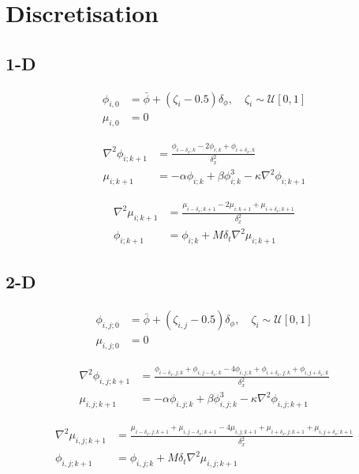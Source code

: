 \documentclass[a4paper,11pt]{article}
\begin{document}
\section*{Discretisation}

\subsection*{1-D}
\begin{align*}
    \phi_{i, 0} &= \bar{\phi} + (\zeta_i - 0.5)\delta_\phi, \quad \zeta_i \sim \mathcal{U}[0,1]\\
    \mu_{i,0} &= 0
\end{align*}

\begin{align*}
    \nabla^2\phi_{i;k+1} &= \frac{\phi_{i-\delta_x;k} - 2\phi_{i;k} + \phi_{i+\delta_x;k}}{\delta_x^{2}}\\
    \mu_{i;k+1} &= - \alpha\phi_{i;k} + \beta\phi_{i;k}^3 - \kappa\nabla^2\phi_{i;k+1}
\end{align*}

\begin{align*}
    \nabla^2\mu_{i;k+1} &= \frac{\mu_{i-\delta_x;k+1} - 2\mu_{i;k+1}+\mu_{i+\delta_x;k+1}}{\delta_x^{2}}\\
    \phi_{i;k+1} &= \phi_{i;k} + M\delta_t\nabla^2\mu_{i;k+1}
\end{align*}

\subsection*{2-D}

\begin{align*}
    \phi_{i,j; 0} &= \bar{\phi} + (\zeta_{i,j} - 0.5)\delta_\phi, \quad \zeta_i \sim \mathcal{U}[0,1]\\
    \mu_{i,j;0} &= 0
\end{align*}

\begin{align*}
    \nabla^2\phi_{i,j;k+1} &= \frac{\phi_{i-\delta_x,j;k} + \phi_{i,j-\delta_x;k} - 4\phi_{i,j;k} + \phi_{i+\delta_x,j;k} + \phi_{i,j+\delta_x;k}}{\delta_x^{2}}\\
    \mu_{i,j;k+1} &= - \alpha\phi_{i,j;k} + \beta\phi_{i,j;k}^3 - \kappa\nabla^2\phi_{i,j;k+1}
\end{align*}

\begin{align*}
    \nabla^2\mu_{i,j;k+1} &= \frac{\mu_{i-\delta_x,j;k+1} + \mu_{i,j-\delta_x;k+1}- 4\mu_{i,j;k+1}+\mu_{i+\delta_x,j;k+1}+\mu_{i,j+\delta_x;k+1}}{\delta_x^{2}}\\
    \phi_{i,j;k+1} &= \phi_{i,j;k} + M\delta_t\nabla^2\mu_{i,j;k+1}
\end{align*}
\end{document}
